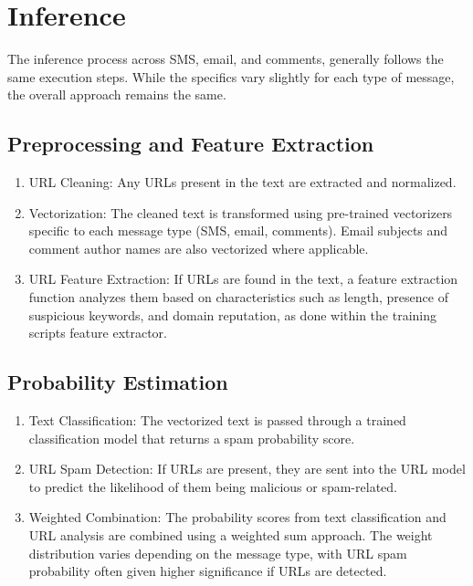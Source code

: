 \documentclass{article}
\begin{document}
\section{Inference}

The inference process across SMS, email, and comments, generally follows the same execution steps. While the specifics vary slightly for each type of message, the overall approach remains the same.


\subsection{Preprocessing and Feature Extraction}

\begin{enumerate}
    \item URL Cleaning: Any URLs present in the text are extracted and normalized.
    \item Vectorization: The cleaned text is transformed using pre-trained vectorizers specific to each message type (SMS, email, comments). Email subjects and comment author names are also vectorized where applicable.
    \item URL Feature Extraction: If URLs are found in the text, a feature extraction function analyzes them based on characteristics such as length, presence of suspicious keywords, and domain reputation, as done within the training scripts feature extractor.
\end{enumerate}

\subsection{Probability Estimation}

\begin{enumerate}
    \item Text Classification: The vectorized text is passed through a trained classification model that returns a spam probability score.
    \item URL Spam Detection: If URLs are present, they are sent into the URL model to predict the likelihood of them being malicious or spam-related.
    \item Weighted Combination: The probability scores from text classification and URL analysis are combined using a weighted sum approach. The weight distribution varies depending on the message type, with URL spam probability often given higher significance if URLs are detected.
\end{enumerate}
\end{document}
